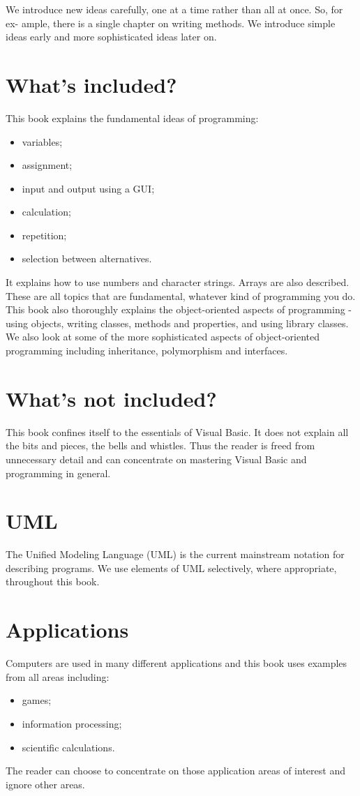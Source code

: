 		We introduce new ideas carefully, one at a time rather than all at once. So, for ex-
ample, there is a single chapter on writing methods. We introduce simple ideas early and more sophisticated ideas later on.


	\section*{What's included?}
		This book explains the fundamental ideas of programming:
		\begin{itemize}
			\item	variables;
			\item	assignment;
			\item	input and output using a GUI;
			\item	calculation;
			\item	repetition;
			\item	selection between alternatives.
		\end{itemize}
		It explains how to use numbers and character strings. Arrays are also described. These are all topics that are fundamental, whatever kind of programming you do. This book also thoroughly explains the object-oriented aspects of programming - using objects, writing classes, methods and properties, and using library classes. We also look at some of the more sophisticated aspects of object-oriented programming including inheritance, polymorphism and interfaces.

	\section*{What's not included?}
		This book confines itself to the essentials of Visual Basic. It does not explain all the bits and pieces, the bells and whistles. Thus the reader is freed from unnecessary detail and can concentrate on mastering Visual Basic and programming in general.

	\section*{UML}
		The Unified Modeling Language (UML) is the current mainstream notation for describing programs. We use elements of UML selectively, where appropriate, throughout this book.

	\section*{Applications}
		Computers are used in many different applications and this book uses examples from all areas including:
		\begin{itemize}
			\item	games;
			\item	information processing;
			\item	scientific calculations.
		\end{itemize}
		The reader can choose to concentrate on those application areas of interest and ignore other areas.

